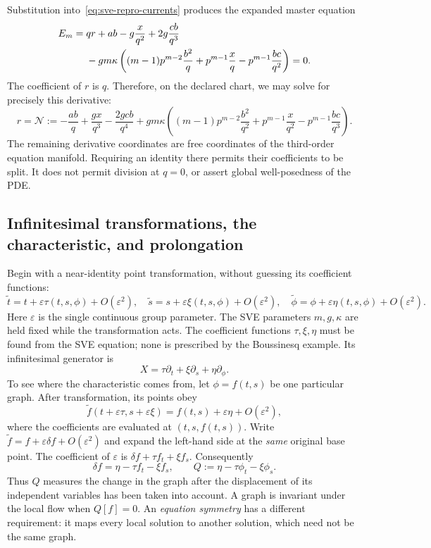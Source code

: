 Substitution into~\eqref{eq:sve-repro-currents} produces the expanded master
equation
\begin{align}
 E_m={}&qr+ab-g\frac{x}{q^2}+2g\frac{cb}{q^3}\notag\\
 &-gm\kappa\left((m-1)p^{m-2}\frac{b^2}{q}
       +p^{m-1}\frac{x}{q}-p^{m-1}\frac{bc}{q^2}\right)=0.
 \label{eq:sve-repro-master}
\end{align}
The coefficient of $r$ is $q$. Therefore, on the declared chart, we may solve
for precisely this derivative:
\begin{equation}
 r=\mathcal N:=-\frac{ab}{q}+\frac{gx}{q^3}-\frac{2gcb}{q^4}
 +gm\kappa\left((m-1)p^{m-2}\frac{b^2}{q^2}
              +p^{m-1}\frac{x}{q^2}-p^{m-1}\frac{bc}{q^3}\right).
 \label{eq:sve-master-normal}
\end{equation}
The remaining derivative coordinates are free coordinates of the
third-order equation manifold. Requiring an identity there permits their
coefficients to be split. It does not permit division at $q=0$, or assert
global well-posedness of the PDE.

\subsection{Infinitesimal transformations, the characteristic, and prolongation}
Begin with a near-identity point transformation, without guessing its
coefficient functions:
\begin{equation}
 \widetilde t=t+\varepsilon\tau(t,s,\phi)+O(\varepsilon^2),\quad
 \widetilde s=s+\varepsilon\xi(t,s,\phi)+O(\varepsilon^2),\quad
 \widetilde\phi=\phi+\varepsilon\eta(t,s,\phi)+O(\varepsilon^2).
 \label{eq:sve-small-transformation}
\end{equation}
Here $\varepsilon$ is the single continuous group parameter. The SVE
parameters $m,g,\kappa$ are held fixed while the transformation acts.
The coefficient functions $\tau,\xi,\eta$ must be found from the SVE
equation; none is prescribed by the Boussinesq example.
Its infinitesimal generator is
\[
 X=\tau\partial_t+\xi\partial_s+\eta\partial_\phi.
\]
To see where the characteristic comes from, let $\phi=f(t,s)$ be one
particular graph. After transformation, its points obey
\[
 \widetilde f(t+\varepsilon\tau,s+\varepsilon\xi)
       =f(t,s)+\varepsilon\eta+O(\varepsilon^2),
\]
where the coefficients are evaluated at $(t,s,f(t,s))$. Write
$\widetilde f=f+\varepsilon\delta f+O(\varepsilon^2)$ and expand the
left-hand side at the \emph{same} original base point. The coefficient of
$\varepsilon$ is $\delta f+\tau f_t+\xi f_s$. Consequently
\begin{equation}
 \delta f=\eta-\tau f_t-\xi f_s,
 \qquad Q:=\eta-\tau\phi_t-\xi\phi_s.
 \label{eq:sve-characteristic-derived}
\end{equation}
Thus $Q$ measures the change in the graph after the displacement of its
independent variables has been taken into account. A graph is invariant
under the local flow when $Q[f]=0$. An \emph{equation symmetry} has a
different requirement: it maps every local solution to another solution,
which need not be the same graph.

